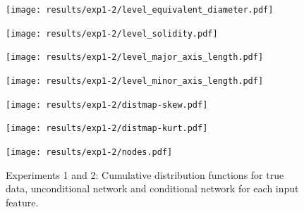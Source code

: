 \begin{figure}[h!] 
    \begin{minipage}[b]{0.45\linewidth}
	\centering
	\texttt{[image: results/exp1-2/level\_equivalent\_diameter.pdf]} 
	\label{fig:results-input-level_equivalent_diameter}
	\end{minipage}
	\hfil
    \begin{minipage}[b]{0.45\linewidth}
	\centering
	\texttt{[image: results/exp1-2/level\_solidity.pdf]} 
	\label{fig:results-input-level_solidity}
	\end{minipage}

    \begin{minipage}[b]{0.45\linewidth}
	\centering
	\texttt{[image: results/exp1-2/level\_major\_axis\_length.pdf]} 
	\label{fig:results-input-level_major_axis_length}
\end{minipage}
\hfil
\begin{minipage}[b]{0.45\linewidth}
	\centering
	\texttt{[image: results/exp1-2/level\_minor\_axis\_length.pdf]} 
	\label{fig:results-input-level_minor_axis_length}
\end{minipage}

    \begin{minipage}[b]{0.45\linewidth}
	\centering
	\texttt{[image: results/exp1-2/distmap-skew.pdf]} 
	\label{fig:results-input-distmap-skew}
\end{minipage}
\hfil
\begin{minipage}[b]{0.45\linewidth}
	\centering
	\texttt{[image: results/exp1-2/distmap-kurt.pdf]} 
	\label{fig:results-input-distmap-kurt}
\end{minipage}

	\centering
	\begin{minipage}[b]{0.45\linewidth}
		\centering
		\texttt{[image: results/exp1-2/nodes.pdf]} 
		\label{fig:results-input-nodes}
	\end{minipage}


\caption[Graphical results for experiments 1 and 2: Cumulative Distributions]{Experiments 1 and 2: Cumulative distribution functions for true data, unconditional network and conditional network for each input feature.}
\label{fig:results-input-features}
\end{figure}


